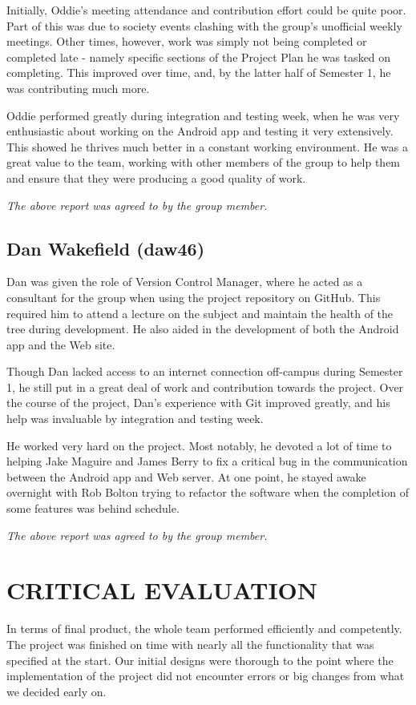 \documentclass{project}
\begin{document}
Initially, Oddie's meeting attendance and contribution effort could be quite poor. Part of this was due to society events clashing with the group's unofficial weekly meetings. Other times, however, work was simply not being completed or completed late - namely specific sections of the Project Plan he was tasked on completing. This improved over time, and, by the latter half of Semester 1, he was contributing much more.

Oddie performed greatly during integration and testing week, when he was very enthusiastic about working on the Android app and testing it very extensively. This showed he thrives much better in a constant working environment. He was a great value to the team, working with other members of the group to help them and ensure that they were producing a good quality of work.

\emph{The above report was agreed to by the group member.}


\newpage


\subsection{Dan Wakefield (daw46)}
Dan was given the role of Version Control Manager, where he acted as a consultant for the group when using the project repository on GitHub. This required him to attend a lecture on the subject and maintain the health of the tree during development. He also aided in the development of both the Android app and the Web site.

Though Dan lacked access to an internet connection off-campus during Semester 1, he still put in a great deal of work and contribution towards the project. Over the course of the project, Dan’s experience with Git improved greatly, and his help was invaluable by integration and testing week. 

He worked very hard on the project. Most notably, he devoted a lot of time to helping Jake Maguire and James Berry to fix a critical bug in the communication between the Android app and Web server. At one point, he stayed awake overnight with Rob Bolton trying to refactor the software when the completion of some features was behind schedule.

\emph{The above report was agreed to by the group member.}


\newpage


\section{CRITICAL EVALUATION}
In terms of final product, the whole team performed efficiently and competently. The project was finished on time with nearly all the functionality that was specified at the start. Our initial designs were thorough to the point where the implementation of the project did not encounter errors or big changes from what we decided early on.
\end{document}
